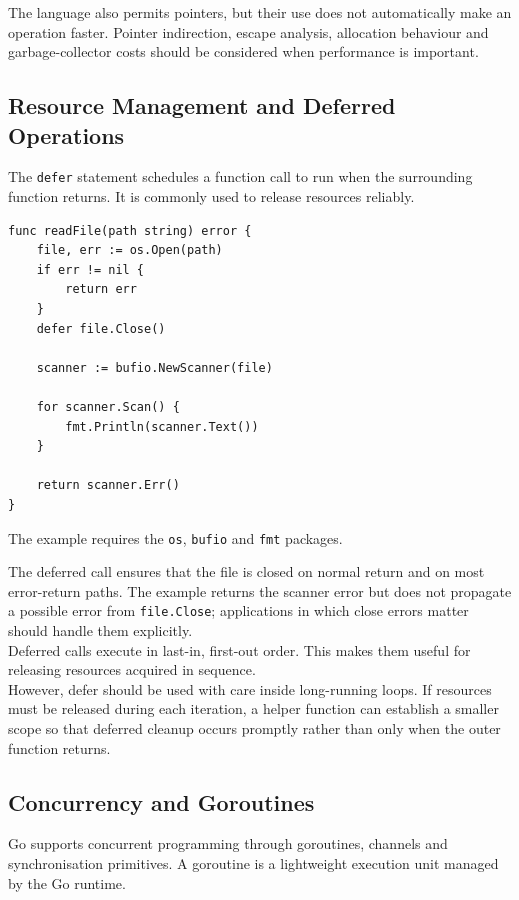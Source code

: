 The language also permits pointers, but their use does not automatically make an operation faster. Pointer indirection, escape analysis, allocation behaviour and garbage-collector costs should be considered when performance is important.

\subsection{Resource Management and Deferred Operations}

The \texttt{defer} statement schedules a function call to run when the surrounding function returns. It is commonly used to release resources reliably.

\begin{lstlisting}
func readFile(path string) error {
    file, err := os.Open(path)
    if err != nil {
        return err
    }
    defer file.Close()

    scanner := bufio.NewScanner(file)

    for scanner.Scan() {
        fmt.Println(scanner.Text())
    }

    return scanner.Err()
}
\end{lstlisting}

The example requires the \texttt{os}, \texttt{bufio} and \texttt{fmt} packages.

The deferred call ensures that the file is closed on normal return and on most error-return paths. The example returns the scanner error but does not propagate a possible error from \texttt{file.Close}; applications in which close errors matter should handle them explicitly.\\

Deferred calls execute in last-in, first-out order. This makes them useful for releasing resources acquired in sequence.\\

However, defer should be used with care inside long-running loops. If resources must be released during each iteration, a helper function can establish a smaller scope so that deferred cleanup occurs promptly rather than only when the outer function returns.

\subsection{Concurrency and Goroutines}

Go supports concurrent programming through goroutines, channels and synchronisation primitives. A goroutine is a lightweight execution unit managed by the Go runtime.\\

